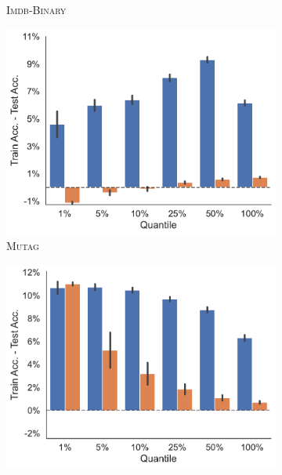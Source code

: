 \begin{figure}[!htb]
\begin{subfigure}[b]{0.3\textwidth}
		\vspace*{-4ex} 
		\caption{\textsc{Imdb-Binary}}
	\end{subfigure}
	\hfill
	\begin{subfigure}[b]{0.3\textwidth}
		\centering
		\includegraphics[width=\textwidth]{Figures/train_test_diff_MUTAG.pdf}
		\vspace*{-4ex} 
		\caption{\textsc{Mutag}}
	\end{subfigure}
	\par\bigskip
	\begin{subfigure}[b]{0.3\textwidth}
		\centering
		\includegraphics[width=\textwidth]{Figures/train_test_diff_NCI1.pdf}
		\vspace*{-4ex} 

\end{subfigure}
\end{figure}
